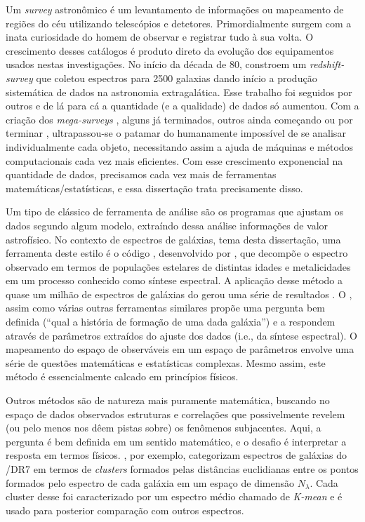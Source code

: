Um {\em survey} astronômico é um levantamento de informações ou mapeamento de regiões do céu utilizando telescópios e
detetores. Primordialmente surgem com a inata curiosidade do homem de observar e registrar tudo à sua volta. O
crescimento desses catálogos é produto direto da evolução dos equipamentos usados nestas investigações. No início da
década de 80, \citet{Huchra1983} constroem um {\em redshift-survey} que coletou espectros para 2500 galaxias dando
início a produção sistemática de dados na astronomia extragalática. Esse trabalho foi seguidos por outros \citep[e.g.,
][]{Huchra1988, DaCosta1988} e de lá para cá a quantidade (e a qualidade) de dados só aumentou. Com a criação dos {\em
mega-surveys} \citep[\SDSS, 2dFGRS, 2MASS; ][]{York2000, Colless1999, Skrutskie2006}, alguns já terminados, outros ainda
começando ou por terminar \citep[LSST, JPAS; ][]{Ivezic2008, Benitez2009}, ultrapassou-se o patamar do humanamente
impossível de se analisar individualmente cada objeto, necessitando assim a ajuda de máquinas e métodos computacionais
cada vez mais eficientes. Com esse crescimento exponencial na quantidade de dados, precisamos cada vez mais de
ferramentas matemáticas/estatísticas, e essa dissertação trata precisamente disso.

Um tipo de clássico de ferramenta de análise são os programas que ajustam os dados segundo algum modelo, extraíndo dessa
análise informações de valor astrofísico. No contexto de espectros de galáxias, tema desta dissertação, uma ferramenta
deste estilo é o código \starlight, desenvolvido por \citet{CidFernandes2005}, que decompõe o espectro observado em
termos de populações estelares de distintas idades e metalicidades em um processo conhecido como síntese espectral.
A aplicação desse método a quase um milhão de espectros de galáxias do \SDSS gerou uma série de resultados \citep[e.g.,
][]{Asari2007, Asari2009, CidFernandes2007, Mateus2007}. O \starlight, assim como várias outras ferramentas similares
\citep{Panter2003, Gallazzi2005, Ocvirk2006} propõe uma pergunta bem definida (``qual a história de formação de
uma dada galáxia'') e a respondem através de parâmetros extraídos do ajuste dos dados (i.e., da síntese espectral). O
mapeamento do espaço de observáveis em um espaço de parâmetros envolve uma série de questões matemáticas e estatísticas
complexas. Mesmo assim, este método é essencialmente calcado em princípios físicos.

Outros métodos são de natureza mais puramente matemática, buscando no espaço de dados observados estruturas e
correlações que possivelmente revelem (ou pelo menos nos dêem pistas sobre) os fenômenos subjacentes. Aqui, a pergunta é
bem definida em um sentido matemático, e o desafio é interpretar a resposta em termos físicos.
\citet{SanchezAlmeida2010}, por exemplo, categorizam espectros de galáxias do \SDSS/DR7 em termos de {\em clusters}
formados pelas distâncias euclidianas entre os pontos formados pelo espectro de cada galáxia em um espaço de dimensão
$N_\lambda$. Cada cluster desse foi caracterizado por um espectro médio chamado de {\em K-mean} e é usado para posterior
comparação com outros espectros. 

